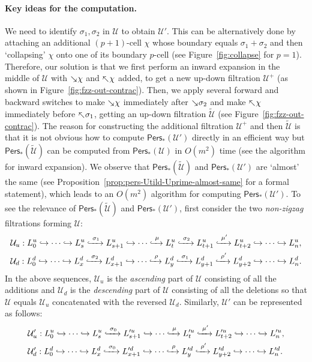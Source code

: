 \documentclass[letterpaper,11pt]{article}
\theoremstyle{mythmstyle}
\theoremstyle{mydefstyle}
\theoremstyle{plain}
\theoremstyle{definition}
\newcommand{\Pers}{\mathsf{Pers}}
\newcommand{\<}[1]{\langle #1\rangle}
\newcommand{\lbarrowspace}{\;}
\newcommand{\incto}{\hookrightarrow}
\newcommand{\inctosp}[1]{\xhookrightarrow{\lbarrowspace#1\lbarrowspace}}
\newcommand{\add}[1]{\mskip-2.5mu\rotatebox[origin=c]{-45}{${\rightarrow}$}{#1}}
\newcommand{\del}[1]{\mskip-2.5mu\rotatebox[origin=c]{-45}{${\leftarrow}$}{#1}}
\newcommand{\Ucal}{\mathcal{U}}
\newcommand{\sG}{\sigma}
\newcommand{\Dim}{p}
\newcommand{\filtcnt}{m}
\newcommand{\simpcnt}{n}
\newcommand{\extsimp}{\chi}
\begin{document}
\paragraph{Key ideas for the computation.}
We need to identify $\sG_1,\sG_2$ in $\Ucal$ to obtain $\Ucal'$. This
can be alternatively done by attaching an additional $(\Dim+1)$-cell $\extsimp$
whose boundary equals $\sG_1+\sG_2$
and then `collapsing' $\extsimp$ onto one of its boundary $\Dim$-cell
(see Figure~\ref{fig:collapse} for $\Dim=1$).
Therefore, our solution is that we first perform an inward expansion 
in the middle of $\Ucal$
with 
$\add{\extsimp}$ and $\del{\extsimp}$
added,
to get a new  up-down filtration  $\Ucal^+$ (as shown in Figure~\ref{fig:fzz-out-contrac}).
Then, we apply several forward and backward switches
to make 
$\add{\extsimp}$ 
immediately after 
$\add{\sG_2}$
and make 
$\del{\extsimp}$ 
immediately before 
$\del{\sG_1}$,
getting an up-down filtration  $\tilde{\Ucal}$ (see Figure~\ref{fig:fzz-out-contrac}).
The reason for constructing the additional filtration $\Ucal^+$ and then $\tilde{\Ucal}$ is 
that 
it is not obvious how to compute $\Pers_*({\Ucal}')$ directly in an efficient way
but $\Pers_*(\tilde{\Ucal})$ can be computed from $\Pers_*({\Ucal})$ in $O(\filtcnt^2)$ time
(see the algorithm for inward expansion).
We observe that $\Pers_*(\tilde{\Ucal})$ and $\Pers_*({\Ucal}')$ are `almost' the same 
(see Proposition~\ref{prop:pers-Utild-Uprime-almost-same} for a formal statement),
which leads to an $O(\filtcnt^2)$ algorithm for computing $\Pers_*({\Ucal}')$.
To see  the relevance of $\Pers_*(\tilde{\Ucal})$ and $\Pers_*({\Ucal}')$, 
first
consider the two \emph{non-zigzag} filtrations forming $\Ucal$:
\begin{align*}
&\Ucal_u:
L^u_0\incto
\cdots\incto
L^u_s\inctosp{\sG_1}
L^u_{s+1}
\incto
\cdots
\inctosp{\mu}
L^u_t\inctosp{\sG_2}
L^u_{t+1}
\inctosp{\mu'}
L^u_{t+2}\incto
\cdots
\incto
L^u_\simpcnt,\\
&\Ucal_d:
L^d_0\incto
\cdots\incto
L^d_x\inctosp{\sG_2}
L^d_{x+1}
\incto
\cdots
\inctosp{\rho}
L^d_y\inctosp{\sG_1}
L^d_{y+1}
\inctosp{\rho'}
L^d_{y+2}\incto
\cdots
\incto
L^d_\simpcnt.
\end{align*}
In the above sequences, 
$\Ucal_u$ is the \emph{ascending} part of $\Ucal$
consisting of all the additions
and $\Ucal_d$ is the \emph{descending} part of $\Ucal$
consisting of all the deletions
so that $\Ucal$ equals $\Ucal_u$ concatenated with the reversed $\Ucal_d$.
Similarly, $\Ucal'$ can be represented as follows:
\begin{align*}
&\Ucal'_u:
L^u_0\incto
\cdots\incto
L^u_s\inctosp{\sG_0}
L'^u_{s+1}
\incto
\cdots\inctosp{\mu}
L'^u_t
\inctosp{\mu'} 
L'^{u}_{t+2}
\incto\cdots
\incto
L'^{u}_\simpcnt,\\
&\Ucal'_d:
L^d_0\incto
\cdots\incto
L^d_x\inctosp{\sG_0}
L'^d_{x+1}
\incto
\cdots
\inctosp{\rho}
L'^{d}_y\inctosp{\rho'}
L'^{d}_{y+2}
\incto
\cdots
\incto
L'^{d}_\simpcnt.
\end{align*}
\end{document}
